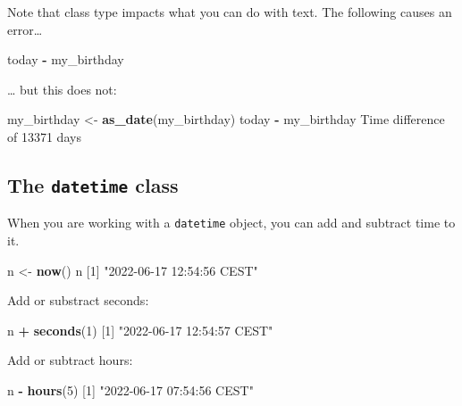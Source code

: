 \documentclass[]{book}
\newenvironment{Shaded}{\begin{snugshade}}{\end{snugshade}}
\newcommand{\DecValTok}[1]{\textcolor[rgb]{0.00,0.00,0.81}{#1}}
\newcommand{\KeywordTok}[1]{\textcolor[rgb]{0.13,0.29,0.53}{\textbf{#1}}}
\newcommand{\NormalTok}[1]{#1}
\newcommand{\OperatorTok}[1]{\textcolor[rgb]{0.81,0.36,0.00}{\textbf{#1}}}
\newcommand{\StringTok}[1]{\textcolor[rgb]{0.31,0.60,0.02}{#1}}
\begin{document}
Note that class type impacts what you can do with text. The following causes an error\ldots{}

\begin{Shaded}
\begin{Highlighting}[]
\NormalTok{today }\OperatorTok{-}\StringTok{ }\NormalTok{my_birthday}
\end{Highlighting}
\end{Shaded}

\ldots{} but this does not:

\begin{Shaded}
\begin{Highlighting}[]
\NormalTok{my_birthday <-}\StringTok{ }\KeywordTok{as_date}\NormalTok{(my_birthday)}
\NormalTok{today }\OperatorTok{-}\StringTok{ }\NormalTok{my_birthday}
\NormalTok{Time difference of }\DecValTok{13371}\NormalTok{ days}
\end{Highlighting}
\end{Shaded}

\hypertarget{the-datetime-class}{%
\subsection*{\texorpdfstring{The \texttt{datetime} class}{The datetime class}}\label{the-datetime-class}}

When you are working with a \texttt{datetime} object, you can add and subtract time to it.

\begin{Shaded}
\begin{Highlighting}[]
\NormalTok{n <-}\StringTok{ }\KeywordTok{now}\NormalTok{() }
\NormalTok{n}
\NormalTok{[}\DecValTok{1}\NormalTok{] }\StringTok{"2022-06-17 12:54:56 CEST"}
\end{Highlighting}
\end{Shaded}

Add or substract seconds:

\begin{Shaded}
\begin{Highlighting}[]
\NormalTok{n }\OperatorTok{+}\StringTok{ }\KeywordTok{seconds}\NormalTok{(}\DecValTok{1}\NormalTok{)}
\NormalTok{[}\DecValTok{1}\NormalTok{] }\StringTok{"2022-06-17 12:54:57 CEST"}
\end{Highlighting}
\end{Shaded}

Add or subtract hours:

\begin{Shaded}
\begin{Highlighting}[]
\NormalTok{n }\OperatorTok{-}\StringTok{ }\KeywordTok{hours}\NormalTok{(}\DecValTok{5}\NormalTok{)}
\NormalTok{[}\DecValTok{1}\NormalTok{] }\StringTok{"2022-06-17 07:54:56 CEST"}
\end{Highlighting}
\end{Shaded}
\end{document}
